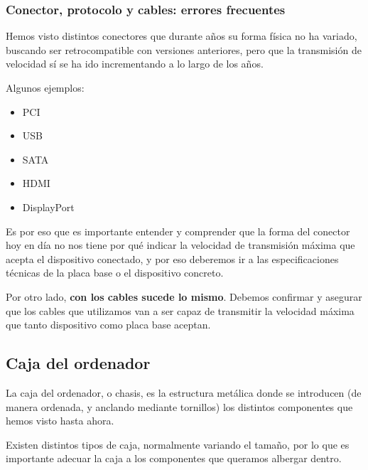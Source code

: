 \subsubsection{Conector, protocolo y cables: errores frecuentes}

Hemos visto distintos conectores que durante años su forma física no ha variado, buscando ser retrocompatible con versiones anteriores, pero que la transmisión de velocidad sí se ha ido incrementando a lo largo de los años.

Algunos ejemplos:

\begin{itemize}
    \item PCI
    \item USB
    \item SATA
    \item HDMI
    \item DisplayPort
\end{itemize}

Es por eso que es importante entender y comprender que la forma del conector hoy en día no nos tiene por qué indicar la velocidad de transmisión máxima que acepta el dispositivo conectado, y por eso deberemos ir a las especificaciones técnicas de la placa base o el dispositivo concreto.

Por otro lado, \textbf{con los cables sucede lo mismo}. Debemos confirmar y asegurar que los cables que utilizamos van a ser capaz de transmitir la velocidad máxima que tanto dispositivo como placa base aceptan.


\vspace{10pt}

\subsection{Caja del ordenador}
La caja del ordenador, o chasis, es la estructura metálica donde se introducen (de manera ordenada, y anclando mediante tornillos) los distintos componentes que hemos visto hasta ahora.

Existen distintos tipos de caja, normalmente variando el tamaño, por lo que es importante adecuar la caja a los componentes que queramos albergar dentro.

\vspace{10pt}

